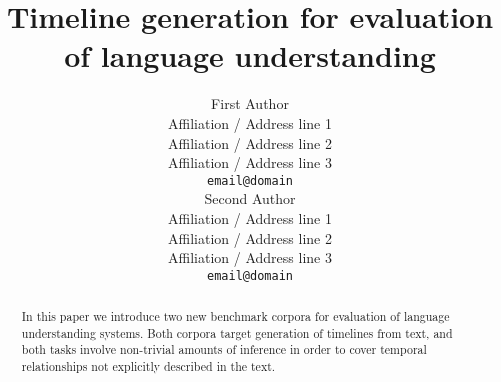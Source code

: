 \documentclass[11pt,a4paper]{article}
\title{Timeline generation for evaluation of language understanding}
\author{First Author \\
  Affiliation / Address line 1 \\
  Affiliation / Address line 2 \\
  Affiliation / Address line 3 \\
  \texttt{email@domain} \\\And
  Second Author \\
  Affiliation / Address line 1 \\
  Affiliation / Address line 2 \\
  Affiliation / Address line 3 \\
  \texttt{email@domain} \\}
\date{}
\begin{document}
\maketitle
\begin{abstract}
In this paper we introduce two new benchmark corpora for evaluation of language understanding systems. Both corpora target generation of timelines from text, and both tasks involve non-trivial amounts of inference in order to cover temporal relationships not explicitly described in the text. 
\end{abstract}













\end{document}
